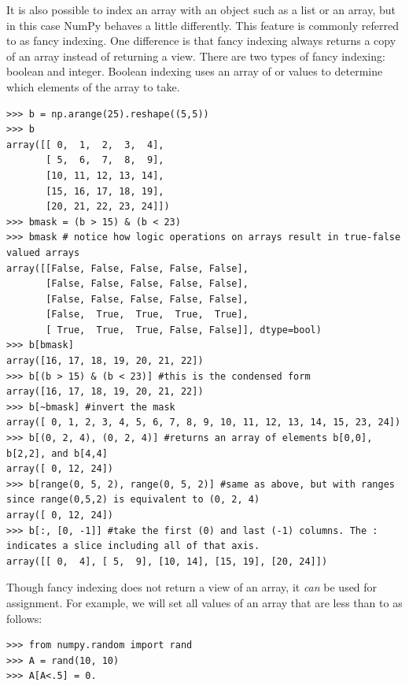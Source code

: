 It is also possible to index an array with an object such as a list or
an array, but in this case NumPy behaves a little differently. This
feature is commonly referred to as fancy indexing. One difference is
that fancy indexing always returns a copy of an array instead of returning 
a view. 
There are two types of fancy indexing: boolean and integer. 
Boolean indexing uses an array of  or  values to 
determine which elements of the array to take. 
\begin{lstlisting}
>>> b = np.arange(25).reshape((5,5)) 
>>> b
array([[ 0,  1,  2,  3,  4],
       [ 5,  6,  7,  8,  9],
       [10, 11, 12, 13, 14],
       [15, 16, 17, 18, 19],
       [20, 21, 22, 23, 24]])
>>> bmask = (b > 15) & (b < 23) 
>>> bmask # notice how logic operations on arrays result in true-false valued arrays
array([[False, False, False, False, False],
       [False, False, False, False, False],
       [False, False, False, False, False],
       [False,  True,  True,  True,  True],
       [ True,  True,  True, False, False]], dtype=bool)
>>> b[bmask]
array([16, 17, 18, 19, 20, 21, 22])
>>> b[(b > 15) & (b < 23)] #this is the condensed form
array([16, 17, 18, 19, 20, 21, 22])
>>> b[~bmask] #invert the mask
array([ 0, 1, 2, 3, 4, 5, 6, 7, 8, 9, 10, 11, 12, 13, 14, 15, 23, 24])
>>> b[(0, 2, 4), (0, 2, 4)] #returns an array of elements b[0,0], b[2,2], and b[4,4]
array([ 0, 12, 24])
>>> b[range(0, 5, 2), range(0, 5, 2)] #same as above, but with ranges since range(0,5,2) is equivalent to (0, 2, 4)
array([ 0, 12, 24])
>>> b[:, [0, -1]] #take the first (0) and last (-1) columns. The : indicates a slice including all of that axis. 
array([[ 0,  4], [ 5,  9], [10, 14], [15, 19], [20, 24]])
\end{lstlisting}

Though fancy indexing does not return a view of an array, it \emph{can}
be used for assignment. For example, we will set all values of an array
that are less than  to  as follows: 
\begin{lstlisting}
>>> from numpy.random import rand 
>>> A = rand(10, 10) 
>>> A[A<.5] = 0.
\end{lstlisting}

